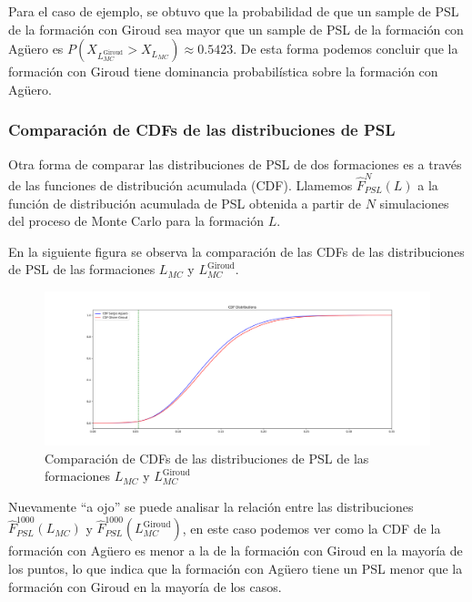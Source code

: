 \documentclass[
  a4paper,
]{article}
\begin{document}
Para el caso de ejemplo, se obtuvo que la probabilidad de que un sample
de PSL de la formación con Giroud sea mayor que un sample de PSL de la
formación con Agüero es
\(P(X_{L_{MC}^{\text{Giroud}}}>X_{L_{MC}}) \approx 0.5423\). De esta
forma podemos concluir que la formación con Giroud tiene dominancia
probabilística sobre la formación con Agüero.

\hypertarget{comparaciuxf3n-de-cdfs-de-las-distribuciones-de-psl}{%
\subsubsection{Comparación de CDFs de las distribuciones de
PSL}\label{comparaciuxf3n-de-cdfs-de-las-distribuciones-de-psl}}

Otra forma de comparar las distribuciones de PSL de dos formaciones es a
través de las funciones de distribución acumulada (CDF). Llamemos
\(\hat{F}^{N}_{PSL}(L)\) a la función de distribución acumulada de PSL
obtenida a partir de \(N\) simulaciones del proceso de Monte Carlo para
la formación \(L\).

En la siguiente figura se observa la comparación de las CDFs de las
distribuciones de PSL de las formaciones \(L_{MC}\) y
\(L_{MC}^{\text{Giroud}}\).

\begin{figure}
  \includegraphics{./recursos_pdf/graficos/sergio_aguero_olivier_giroud_cdf_intersection.png}
    \caption{Comparación de CDFs de las distribuciones de PSL de las formaciones $L_{MC}$ y $L_{MC}^{\text{Giroud}}$}
\end{figure}

Nuevamente ``a ojo'' se puede analisar la relación entre las
distribuciones \(\hat{F}^{1000}_{PSL}(L_{MC})\) y
\(\hat{F}^{1000}_{PSL}(L_{MC}^{\text{Giroud}})\), en este caso podemos
ver como la CDF de la formación con Agüero es menor a la de la formación
con Giroud en la mayoría de los puntos, lo que indica que la formación
con Agüero tiene un PSL menor que la formación con Giroud en la mayoría
de los casos.
\end{document}
